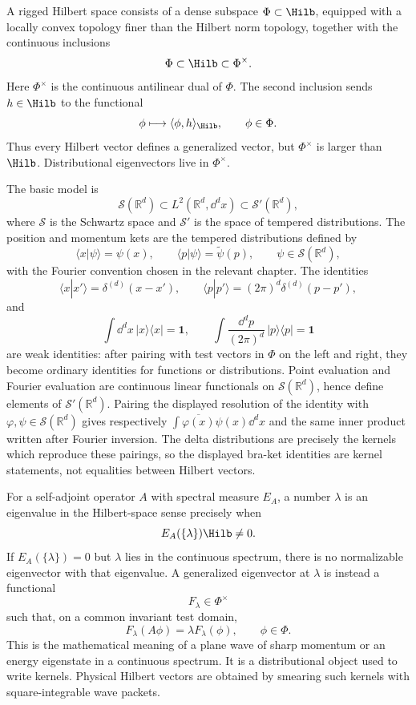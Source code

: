 \begin{definition}
\label{def:rigged-hilbert-space}
A rigged Hilbert space consists of a dense subspace \(\Phi\subset\Hilb\),
equipped with a locally convex topology finer than the Hilbert norm topology,
together with the continuous inclusions
\[
  \Phi\subset\Hilb\subset\Phi^\times .
\]
Here \(\Phi^\times\) is the continuous antilinear dual of \(\Phi\). The second
inclusion sends \(h\in\Hilb\) to the functional
\[
  \phi\longmapsto \langle \phi,h\rangle_{\Hilb},
  \qquad \phi\in\Phi .
\]
Thus every Hilbert vector defines a generalized vector, but
\(\Phi^\times\) is larger than \(\Hilb\). Distributional eigenvectors live in
\(\Phi^\times\).
\end{definition}

The basic model is
\[
  \mathcal S(\mathbb R^d)
  \subset
  L^2(\mathbb R^d,\dd^d x)
  \subset
  \mathcal S'(\mathbb R^d),
\]
where \(\mathcal S\) is the Schwartz space and \(\mathcal S'\) is the space
of tempered distributions. The position and momentum kets are the tempered
distributions defined by
\[
  \langle x|\psi\rangle=\psi(x),
  \qquad
  \langle p|\psi\rangle=\widetilde\psi(p),
  \qquad
  \psi\in\mathcal S(\mathbb R^d),
\]
with the Fourier convention chosen in the relevant chapter. The identities
\[
  \langle x|x'\rangle=\delta^{(d)}(x-x'),
  \qquad
  \langle p|p'\rangle=(2\pi)^d\delta^{(d)}(p-p'),
\]
and
\[
  \int\dd^d x\,|x\rangle\langle x|=\mathbf 1,
  \qquad
  \int\frac{\dd^d p}{(2\pi)^d}\,|p\rangle\langle p|=\mathbf 1
\]
are weak identities: after pairing with test vectors in \(\Phi\) on the left
and right, they become ordinary identities for functions or distributions.
Point evaluation and Fourier evaluation are continuous linear functionals on
\(\mathcal S(\mathbb R^d)\), hence define elements of
\(\mathcal S'(\mathbb R^d)\).  Pairing the displayed resolution of the
identity with \(\varphi,\psi\in\mathcal S(\mathbb R^d)\) gives respectively
\(\int \overline{\varphi(x)}\psi(x)\dd^dx\) and the same inner product written
after Fourier inversion.  The delta distributions are precisely the kernels
which reproduce these pairings, so the displayed bra-ket identities are kernel
statements, not equalities between Hilbert vectors.

\begin{definition}
\label{def:generalized-eigenvector-rigged-hilbert}
For a self-adjoint operator \(A\) with spectral measure \(E_A\), a number
\(\lambda\) is an eigenvalue in the Hilbert-space sense precisely when
\[
  E_A(\{\lambda\})\Hilb\ne0 .
\]
If \(E_A(\{\lambda\})=0\) but \(\lambda\) lies in the continuous spectrum,
there is no normalizable eigenvector with that eigenvalue. A generalized
eigenvector at \(\lambda\) is instead a functional
\[
  F_\lambda\in\Phi^\times
\]
such that, on a common invariant test domain,
\[
  F_\lambda(A\phi)=\lambda F_\lambda(\phi),
  \qquad
  \phi\in\Phi .
\]
This is the mathematical meaning of a plane wave of sharp momentum or an
energy eigenstate in a continuous spectrum. It is a distributional object
used to write kernels. Physical Hilbert vectors are obtained by smearing such
kernels with square-integrable wave packets.
\end{definition}

